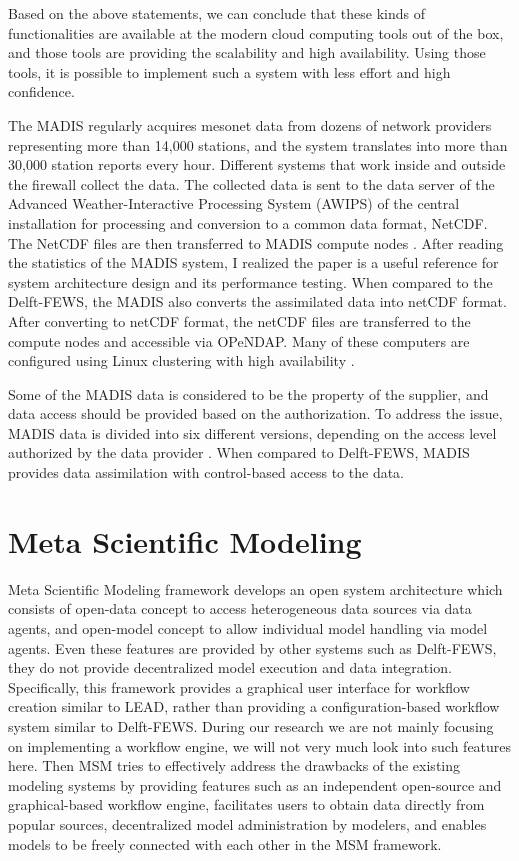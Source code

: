 Based on the above statements, we can conclude that these kinds of functionalities are available at the modern cloud computing tools out of the box, and those tools are providing the scalability and high availability. Using those tools, it is possible to implement such a system with less effort and high confidence.

The MADIS regularly acquires mesonet data from dozens of network providers representing more than 14,000 stations, and the system translates into more than 30,000 station reports every hour. Different systems that work inside and outside the firewall collect the data. The collected data is sent to the data server of the Advanced Weather-Interactive Processing System (AWIPS) of the central installation for processing and conversion to a common data format, NetCDF. The NetCDF files are then transferred to MADIS compute nodes \cite{Macdermaid2005ArchitectureP2.39}. After reading the statistics of the MADIS system, I realized the paper is a useful reference for system architecture design and its performance testing. When compared to the Delft-FEWS, the MADIS also converts the assimilated data into netCDF format. After converting to netCDF format, the netCDF files are transferred to the compute nodes and accessible via OPeNDAP. Many of these computers are configured using Linux clustering with high availability \cite{Macdermaid2005ArchitectureP2.39}.

Some of the MADIS data is considered to be the property of the supplier, and data access should be provided based on the authorization. To address the issue, MADIS data is divided into six different versions, depending on the access level authorized by the data provider \cite{Macdermaid2005ArchitectureP2.39}. When compared to Delft-FEWS, MADIS provides data assimilation with control-based access to the data.

\section{Meta Scientific Modeling}
\label{se:msm}

Meta Scientific Modeling framework develops an open system architecture which consists of open-data concept to access heterogeneous data sources via data agents, and open-model concept to allow individual model handling via model agents. Even these features are provided by other systems such as Delft-FEWS, they do not provide decentralized model execution and data integration. Specifically, this framework provides a graphical user interface for workflow creation similar to LEAD, rather than providing a configuration-based workflow system similar to Delft-FEWS. During our research we are not mainly focusing on implementing a workflow engine, we will not very much look into such features here.
Then MSM tries to effectively address the drawbacks of the existing modeling systems by providing features such as an independent open-source and graphical-based workflow engine, facilitates users to obtain data directly from popular sources, decentralized model administration by modelers, and enables models to be freely connected with each other in the MSM framework.

